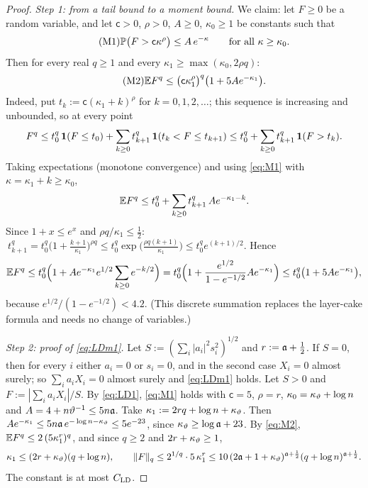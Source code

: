 \begin{proof}
\emph{Step 1: from a tail bound to a moment bound.} We claim: let $F\ge0$ be a random variable, and let $\mathsf c>0$, $\rho>0$, $A\ge0$, $\kappa_0\ge1$ be constants such that
\begin{equation}\tag{M1}\label{eq:M1}
 \mathbb{P}\big(F>\mathsf c\kappa^{\rho}\big)\le A\,e^{-\kappa}\qquad\text{for all }\kappa\ge\kappa_0 .
\end{equation}
Then for every real $q\ge1$ and every $\kappa_1\ge\max(\kappa_0,2\rho q)$:
\begin{equation}\tag{M2}\label{eq:M2}
 \mathbb{E} F^q\le\big(\mathsf c\kappa_1^{\rho}\big)^q\big(1+5Ae^{-\kappa_1}\big).
\end{equation}
Indeed, put $t_k:=\mathsf c(\kappa_1+k)^\rho$ for $k=0,1,2,\dots$; this sequence is increasing and unbounded, so at every point
\[
 F^q\le t_0^q\,\mathbf{1}(F\le t_0)+\sum_{k\ge0}t_{k+1}^q\,\mathbf{1}(t_k<F\le t_{k+1})\le t_0^q+\sum_{k\ge0}t_{k+1}^q\,\mathbf{1}(F>t_k).
\]
Taking expectations (monotone convergence) and using \eqref{eq:M1} with $\kappa=\kappa_1+k\ge\kappa_0$,
\[
 \mathbb{E} F^q\le t_0^q+\sum_{k\ge0}t_{k+1}^q\,Ae^{-\kappa_1-k}.
\]
Since $1+x\le e^x$ and $\rho q/\kappa_1\le\frac12$: $\ t_{k+1}^q=t_0^q\big(1+\frac{k+1}{\kappa_1}\big)^{\rho q}\le t_0^q\exp\big(\frac{\rho q(k+1)}{\kappa_1}\big)\le t_0^qe^{(k+1)/2}$. Hence
\[
 \mathbb{E} F^q\le t_0^q\Big(1+Ae^{-\kappa_1}e^{1/2}\sum_{k\ge0}e^{-k/2}\Big)=t_0^q\Big(1+\frac{e^{1/2}}{1-e^{-1/2}}Ae^{-\kappa_1}\Big)\le t_0^q\big(1+5Ae^{-\kappa_1}\big),
\]
because $e^{1/2}/(1-e^{-1/2})<4.2$. (This discrete summation replaces the layer-cake formula and needs no change of variables.)

\emph{Step 2: proof of \eqref{eq:LDm1}.} Let $S:=(\sum_i|a_i|^2s_i^2)^{1/2}$ and $r:=\mathfrak{a}+\frac12$. If $S=0$, then for every $i$ either $a_i=0$ or $s_i=0$, and in the second case $X_i=0$ almost surely; so $\sum_ia_iX_i=0$ almost surely and \eqref{eq:LDm1} holds.
Let $S>0$ and $F:=|\sum_ia_iX_i|/S$. By \eqref{eq:LD1}, \eqref{eq:M1} holds with $\mathsf c=5$, $\rho=r$, $\kappa_0=\kappa_\vartheta+\log n$ and $A=4+n\vartheta^{-1}\le5n\mathfrak{a}$.
Take $\kappa_1:=2rq+\log n+\kappa_\vartheta$. Then $Ae^{-\kappa_1}\le5n\mathfrak{a}\,e^{-\log n-\kappa_\vartheta}\le5e^{-23}$, since $\kappa_\vartheta\ge\log\mathfrak{a}+23$. By \eqref{eq:M2},
$\mathbb{E} F^q\le2\,(5\kappa_1^r)^q$, and since $q\ge2$ and $2r+\kappa_\vartheta\ge1$,
\[
 \kappa_1\le(2r+\kappa_\vartheta)(q+\log n),\qquad\|F\|_q\le2^{1/q}\cdot5\,\kappa_1^r\le10\,(2\mathfrak{a}+1+\kappa_\vartheta)^{\mathfrak{a}+\frac12}(q+\log n)^{\mathfrak{a}+\frac12}.
\]
The constant is at most $C_{\rm LD}$.


\end{proof}
